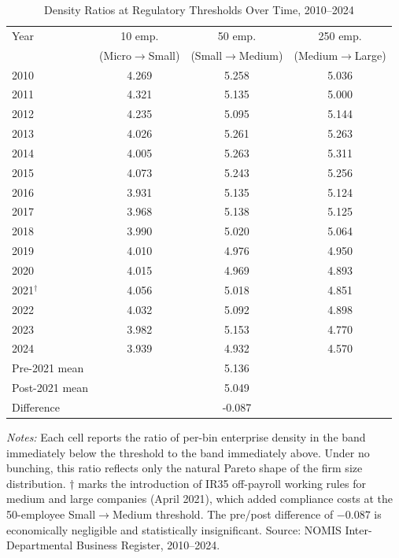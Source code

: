 \begin{table}[htbp]
\centering
\caption{Density Ratios at Regulatory Thresholds Over Time, 2010--2024}
\label{tab:timeseries}
\begin{threeparttable}
\begin{tabular}{lccc}
\toprule
Year & 10 emp. & 50 emp. & 250 emp. \\
 & (Micro$\to$Small) & (Small$\to$Medium) & (Medium$\to$Large) \\
\midrule
2010 & 4.269 & 5.258 & 5.036 \\
2011 & 4.321 & 5.135 & 5.000 \\
2012 & 4.235 & 5.095 & 5.144 \\
2013 & 4.026 & 5.261 & 5.263 \\
2014 & 4.005 & 5.263 & 5.311 \\
2015 & 4.073 & 5.243 & 5.256 \\
2016 & 3.931 & 5.135 & 5.124 \\
2017 & 3.968 & 5.138 & 5.125 \\
2018 & 3.990 & 5.020 & 5.064 \\
2019 & 4.010 & 4.976 & 4.950 \\
2020 & 4.015 & 4.969 & 4.893 \\
2021$^{\dagger}$ & 4.056 & 5.018 & 4.851 \\
2022 & 4.032 & 5.092 & 4.898 \\
2023 & 3.982 & 5.153 & 4.770 \\
2024 & 3.939 & 4.932 & 4.570 \\
\midrule
Pre-2021 mean & & 5.136 & \\
Post-2021 mean & & 5.049 & \\
Difference & & -0.087 & \\
\bottomrule
\end{tabular}
\begin{tablenotes}[flushleft]
\small
\item \textit{Notes:} Each cell reports the ratio of per-bin enterprise density in the band
immediately below the threshold to the band immediately above. Under no bunching, this ratio
reflects only the natural Pareto shape of the firm size distribution. $\dagger$ marks the
introduction of IR35 off-payroll working rules for medium and large companies (April 2021),
which added compliance costs at the 50-employee Small$\to$Medium threshold. The pre/post
difference of $-0.087$ is economically negligible and
statistically insignificant. Source: NOMIS Inter-Departmental Business Register, 2010--2024.
\end{tablenotes}
\end{threeparttable}
\end{table}

